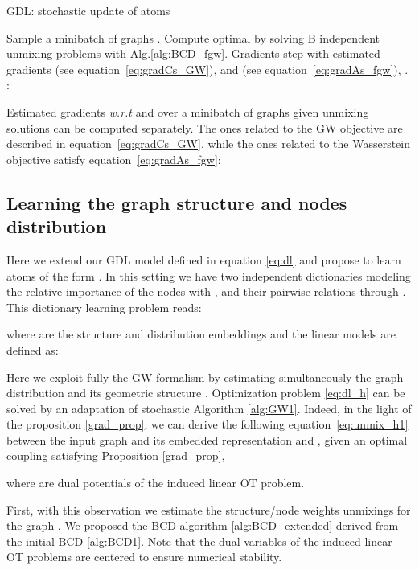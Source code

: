 \documentclass{article}
\def\eqref#1{equation~\ref{#1}}
\begin{document}
	\begin{algorithm}[h]
		\caption{GDL: stochastic update of atoms }
		\label{alg:FGW1}
		\begin{algorithmic}[1]
			\STATE Sample a minibatch of graphs  .
			\STATE Compute optimal  by solving B independent unmixing problems with Alg.\ref{alg:BCD_fgw}. 
			\STATE Gradients step with estimated gradients  (see \eqref{eq:gradCs_GW}), and  (see \eqref{eq:gradAs_fgw}), . : \vspace{-2mm}
			
			
		\end{algorithmic}
	\end{algorithm}
	Estimated gradients \emph{w.r.t}  and  over a minibatch of graphs  given unmixing solutions  can be computed separately. The ones related to the GW objective are described in \eqref{eq:gradCs_GW}, while the ones related to the Wasserstein objective satisfy \eqref{eq:gradAs_fgw}:
	
	\subsection{Learning the graph structure and nodes distribution}
	Here we extend our GDL model defined in
	equation \ref{eq:dl} and propose to learn atoms of the form . In this setting we have
	two independent dictionaries modeling the relative importance of the nodes with
	, and their pairwise relations through . This
	dictionary learning problem reads:
	
	where  are the structure and distribution embeddings and the linear models are defined as:
	
	Here we exploit fully the GW
	formalism by estimating simultaneously the graph distribution 
	and its geometric structure . Optimization problem \ref{eq:dl_h} can
	be solved by an adaptation of stochastic Algorithm \ref{alg:GW1}. Indeed, in the light of the proposition \ref{grad_prop}, we can derive the following \eqref{eq:unmix_h1} between the input graph  and its embedded representation  and , given an optimal coupling  satisfying Proposition \ref{grad_prop}, 
	
	where  are dual potentials of the induced linear OT problem.
	
	First, with this observation we estimate
	the structure/node weights unmixings
	 for the graph . We proposed the BCD algorithm \ref{alg:BCD_extended} derived from the initial BCD \ref{alg:BCD1}. Note that the dual variables of the induced linear OT problems are centered to ensure numerical stability. 
	
\end{document}
